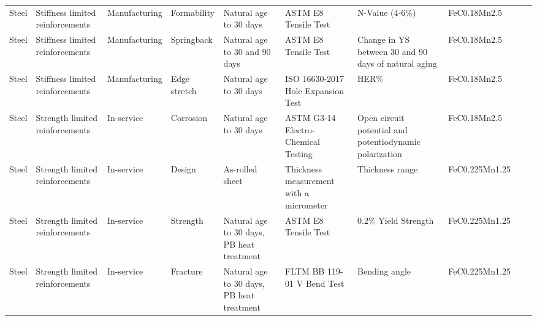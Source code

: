 \begin{table}[!htbp]
\begin{threeparttable}
{\begin{tabular}{@{}p{1.5cm} p{2.4cm} p{2cm} p{2.5cm} p{4cm} p{3.5cm} p{3.8cm} p{3.2cm} p{2.7cm} p{2.7cm}@{}}
{Steel}    & {Stiffness limited reinforcements} & {Manufacturing} & {Formability}     & {Natural age to 30 days}                                              & {ASTM E8 Tensile Test}                    & {N-Value (4-6\%)}                                          & {FeC0.18Mn2.5}                & {}             & {}                   \\
{Steel}    & {Stiffness limited reinforcements} & {Manufacturing} & {Springback}      & {Natural age to 30 and 90 days}                                       & {ASTM E8 Tensile Test}                    & {Change in YS between 30 and 90 days of natural aging}     & {FeC0.18Mn2.5}                & {}             & {}                   \\
{Steel}    & {Stiffness limited reinforcements} & {Manufacturing} & {Edge stretch}    & {Natural age to 30 days}                                              & {ISO 16630-2017 Hole Expansion Test}      & {HER\%}                                                    & {FeC0.18Mn2.5}                & {}             & {}                   \\ \hline
{Steel}    & {Strength limited reinforcements}  & {In-service}    & {Corrosion}       & {Natural age to 30 days}                                              & {ASTM G3-14 Electro-Chemical Testing}     & {Open circuit potential and potentiodynamic polarization}  & {FeC0.18Mn2.5}                & {}             & {}                   \\
{Steel}    & {Strength limited reinforcements}  & {In-service}    & {Design}          & {As-rolled sheet}                                                     & {Thickness measurement with a micrometer} & {Thickness range}                                          & {FeC0.225Mn1.25}              & {}             & {}                   \\
{Steel}    & {Strength limited reinforcements}  & {In-service}    & {Strength}        & {Natural age to 30 days, PB heat treatment}                           & {ASTM E8 Tensile Test}                    & {0.2\% Yield Strength}                                     & {FeC0.225Mn1.25}              & {}             & {}                   \\
{Steel}    & {Strength limited reinforcements}  & {In-service}    & {Fracture}        & {Natural age to 30 days, PB heat treatment}                           & {FLTM BB 119-01 V Bend Test}              & {Bending angle}                                            & {FeC0.225Mn1.25}              & {}             & {}                   \\ 

\end{tabular}}
\end{threeparttable}
\end{table}

